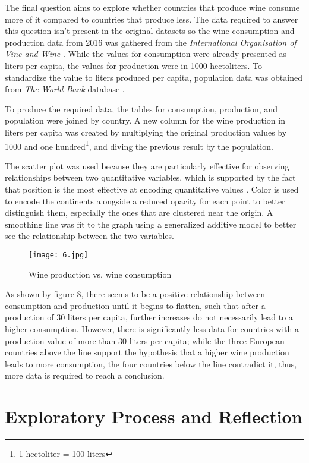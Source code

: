 The final question aims to explore whether countries that produce wine consume more of it compared to countries that produce less. The data required to answer this question isn't present in the original datasets so the wine consumption and production data from 2016 was gathered from the \emph{International Organisation of Vine and Wine} \cite{OIV}. While the values for consumption were already presented as liters per capita, the values for production were in 1000 hectoliters. To standardize the value to liters produced per capita, population data was obtained from \emph{The World Bank} database \cite{WorldBank}.

To produce the required data, the tables for consumption, production, and population were joined by country. A new column for the wine production in liters per capita was created by multiplying the original production values by 1000 and one hundred\footnote{1 hectoliter = 100 liters}, and diving the previous result by the population.

The scatter plot was used because they are particularly effective for observing relationships between two quantitative variables, which is supported by the fact that position is the most effective at encoding quantitative values \cite{Mackinlay}. Color is used to encode the continents alongside a reduced opacity for each point to better distinguish them, especially the ones that are clustered near the origin. A smoothing line was fit to the graph using a generalized additive model to better see the relationship between the two variables.

\begin{figure}[h]
  \texttt{[image: 6.jpg]}
  \caption{Wine production vs. wine consumption}
\end{figure}

As shown by figure 8, there seems to be a positive relationship between consumption and production until it begins to flatten, such that after a production of 30 liters per capita, further increases do not necessarily lead to a higher consumption. However, there is significantly less data for countries with a production value of more than 30 liters per capita; while the three European countries above the line support the hypothesis that a higher wine production leads to more consumption, the four countries below the line contradict it, thus, more data is required to reach a conclusion.


\section{Exploratory Process and Reflection}

